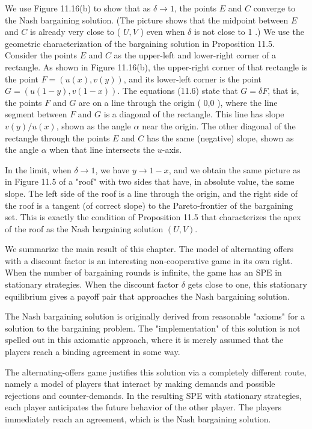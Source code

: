 \documentclass[12pt]{article}
\begin{document}
We use Figure 11.16(b) to show that as $\delta \rightarrow 1$, the points $E$ and $C$ converge to the Nash bargaining solution. (The picture shows that the midpoint between $E$ and $C$ is already very close to ( $U, V$ ) even when $\delta$ is not close to 1 .) We use the geometric characterization of the bargaining solution in Proposition 11.5. Consider the points $E$ and $C$ as the upper-left and lower-right corner of a rectangle. As shown in Figure 11.16(b), the upper-right corner of that rectangle is the point $F=(u(x), v(y))$, and its lower-left corner is the point $G=(u(1-y), v(1-x))$. The equations (11.6) state that $G=\delta F$, that is, the points $F$ and $G$ are on a line through the origin ( 0,0 ), where the line segment between $F$ and $G$ is a diagonal of the rectangle. This line has slope $v(y) / u(x)$, shown as the angle $\alpha$ near the origin. The other diagonal of the rectangle through the points $E$ and $C$ has the same (negative) slope, shown as the angle $\alpha$ when that line intersects the $u$-axis.

In the limit, when $\delta \rightarrow 1$, we have $y \rightarrow 1-x$, and we obtain the same picture as in Figure 11.5 of a "roof" with two sides that have, in absolute value, the same slope. The left side of the roof is a line through the origin, and the right side of the roof is a tangent (of correct slope) to the Pareto-frontier of the bargaining set. This is exactly the condition of Proposition 11.5 that characterizes the apex of the roof as the Nash bargaining solution $(U, V)$.

We summarize the main result of this chapter. The model of alternating offers with a discount factor is an interesting non-cooperative game in its own right. When the number of bargaining rounds is infinite, the game has an SPE in stationary strategies. When the discount factor $\delta$ gets close to one, this stationary equilibrium gives a payoff pair that approaches the Nash bargaining solution.

The Nash bargaining solution is originally derived from reasonable "axioms" for a solution to the bargaining problem. The "implementation" of this solution is not spelled out in this axiomatic approach, where it is merely assumed that the players reach a binding agreement in some way.

The alternating-offers game justifies this solution via a completely different route, namely a model of players that interact by making demands and possible\\
rejections and counter-demands. In the resulting SPE with stationary strategies, each player anticipates the future behavior of the other player. The players immediately reach an agreement, which is the Nash bargaining solution.
\end{document}
